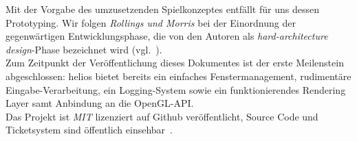 \noindent
Mit der Vorgabe des umzusetzenden Spielkonzeptes entfällt für uns dessen Prototyping.
Wir folgen \textit{Rollings und Morris} bei der Einordnung der gegenwärtigen Entwicklungsphase, die von den Autoren als \textit{hard-architecture design}-Phase bezeichnet wird (vgl.~\cite[628]{RM04}).\\

Zum Zeitpunkt der Veröffentlichung dieses Dokumentes ist der erste Meilenstein abgeschlossen: helios bietet bereits ein einfaches Fenstermanagement, rudimentäre Eingabe-Verarbeitung, ein Logging-System sowie ein funktionierendes Rendering Layer samt Anbindung an die OpenGL-API.\\

Das Projekt ist \textit{MIT} lizenziert auf Github veröffentlicht, Source Code und Ticketsystem sind öffentlich einsehbar~\cite[]{heliosgithub}.
